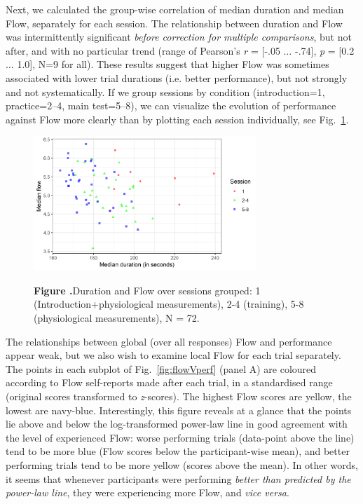 \documentclass{frontierstyle/frontiersSCNS}
\newcommand{\nicewidth}{0.75\textwidth}
\begin{document}
Next, we calculated the group-wise correlation of median duration and median Flow, separately for each session. The relationship between duration and Flow was intermittently significant {\it before correction for multiple comparisons}, but not after, and with no particular trend (range of Pearson's {\it r} = [-.05 $\dots$ -.74], {\it p} = [0.2 $\dots$ 1.0], N=9 for all). These results suggest that higher Flow was sometimes associated with lower trial durations (i.e. better performance), but not strongly and not systematically. If we group sessions by condition (introduction=1, practice=2--4, main test=5--8), we can visualize the evolution of performance against Flow more clearly than by plotting each session individually, see Fig.~\ref{fig:FlowVdurXssn}.%

\begin{figure}[!t]
\begin{center}
  \includegraphics[width=\nicewidth]{5_session_flowDuration_v3}
\end{center}
  \textbf{\label{fig:FlowVdurXssn} Figure .}{Duration and Flow over sessions grouped: 1 (Introduction+physiological measurements), 2-4 (training), 5-8 (physiological measurements), N = 72.}
\end{figure}

The relationships between global (over all responses) Flow and performance appear weak, but we also wish to examine local Flow for each trial separately. The points in each subplot of Fig.~\ref{fig:flowVperf} (panel A) are coloured according to Flow self-reports made after each trial, in a standardised range (original scores transformed to {\it z}-scores). The highest Flow scores are yellow, the lowest are navy-blue. Interestingly, this figure reveals at a glance that the points lie above and below the log-transformed power-law line in good agreement with the level of experienced Flow: worse performing trials (data-point above the line) tend to be more blue (Flow scores below the participant-wise mean), and better performing trials tend to be more yellow (scores above the mean). In other words, it seems that whenever participants were performing {\it better than predicted by the power-law line}, they were experiencing more Flow, and {\it vice versa}.
\end{document}
